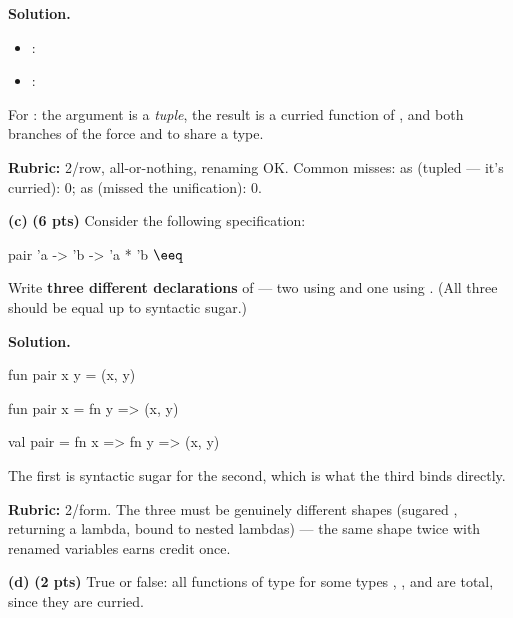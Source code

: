 \documentclass[crop=false]{standalone}
\newif\ifsol
\newenvironment{solution}
    {\par\color{solution_color}\begin{framed}\textbf{Solution.}\par}
    {\end{framed}}
\newcommand{\subpts}[1]{\textbf{(#1 pts)}}
\newcommand{\answerspace}[1]{\ifsol\else\vspace{#1}\par\fi}
\begin{document}
\begin{solution}
\begin{itemize}
  \item {} : 
  \item {} : 
\end{itemize}

For : the argument is a \emph{tuple}, the result is a
curried function of , and both branches of the
 force  and  to share a type.

\textbf{Rubric:} 2/row, all-or-nothing, renaming OK. Common misses:
 as  (tupled --- it's
curried): 0;  as 
(missed the unification): 0.
\end{solution}

\vspace{0.5em}

\textbf{(c)} \subpts{6} Consider the following specification:

\spec
  {pair}
  {'a -> 'b -> 'a * 'b}
  {}
  { $\eeq$ }

Write \textbf{three different declarations} of  --- two
using  and one using . (All three should be
equal up to syntactic sugar.)

\answerspace{10cm}

\begin{solution}
\begin{codeblock}
  fun pair x y = (x, y)

  fun pair x = fn y => (x, y)

  val pair = fn x => fn y => (x, y)
\end{codeblock}

The first is syntactic sugar for the second, which is what the third
binds directly.

\textbf{Rubric:} 2/form. The three must be genuinely different shapes
(sugared ,  returning a lambda,  bound to
nested lambdas) --- the same shape twice with renamed variables earns
credit once.
\end{solution}

\vspace{0.5em}

\textbf{(d)} \subpts{2} True or false: all functions of
type  for some types , , and  are
total, since they are curried.
\end{document}
